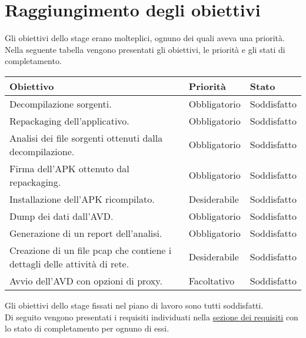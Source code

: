 

\section{Raggiungimento degli obiettivi}\label{sec:raggiungimento-degli-obiettivi}
Gli obiettivi dello stage erano molteplici, ognuno dei quali aveva una priorità.
Nella seguente tabella vengono presentati gli obiettivi, le priorità e gli stati di completamento.

\begin{longtable}{|C{7cm}|C{3cm}|C{3cm}|}
    \hline
    \textbf{Obiettivo} &
    \textbf{Priorità} &
    \textbf{Stato} \\\hline
    Decompilazione sorgenti.
    & Obbligatorio & Soddisfatto \\\hline
    Repackaging dell'applicativo.
    & Obbligatorio & Soddisfatto \\\hline
    Analisi dei file sorgenti ottenuti dalla decompilazione.
    & Obbligatorio & Soddisfatto \\\hline
    Firma dell'APK ottenuto dal repackaging.
    & Obbligatorio & Soddisfatto \\\hline
    Installazione dell'APK ricompilato.
    & Desiderabile & Soddisfatto \\\hline
    Dump dei dati dall'AVD.
    & Obbligatorio & Soddisfatto \\\hline
    Generazione di un report dell'analisi.
    & Obbligatorio & Soddisfatto \\\hline
    Creazione di un file \gls{pcap} che contiene i dettagli delle attività di rete.
    & Desiderabile & Soddisfatto \\\hline
    Avvio dell'AVD con opzioni di proxy.
    & Facoltativo  & Soddisfatto \\\hline
\end{longtable}
Gli obiettivi dello stage fissati nel piano di lavoro sono tutti soddisfatti.\\
Di seguito vengono presentati i requisiti individuati nella  \hyperref[subsec:classificazione]{sezione dei requisiti} con lo stato di completamento per ognuno di essi.
